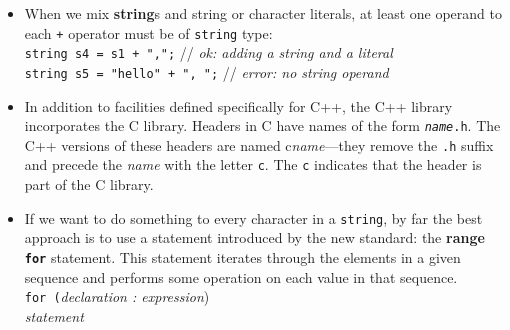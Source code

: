 \begin{itemize}
\item
When we mix \textbf{string}s and string or character literals, at least one operand to each \texttt{+} operator must be of \texttt{string} type:\\
\hspace*{1em}\texttt{string s4 = s1 + ",";} // \textit{ok: adding a string and a literal}\\
\hspace*{1em}\texttt{string s5 = "hello" + ", ";} // \textit{error: no string operand}

\item
In addition to facilities defined specifically for C++, the C++ library incorporates the C library. Headers in C have names of the form \texttt{\textit{name}.h}. The C++ versions of these headers are named c\textit{name}---they remove the \texttt{.h} suffix and precede the \textit{name} with the letter \texttt{c}. The \texttt{c} indicates that the header is part of the C library.

\item
If we want to do something to every character in a \texttt{string}, by far the best approach is to use a statement introduced by the new standard: the \textbf{range \texttt{for}} statement. This statement iterates through the elements in a given sequence and performs some operation on each value in that sequence.\\
\hspace*{1em}\texttt{for (}\textit{declaration : expression})\\
\hspace*{3em}\textit{statement}


\end{itemize}
